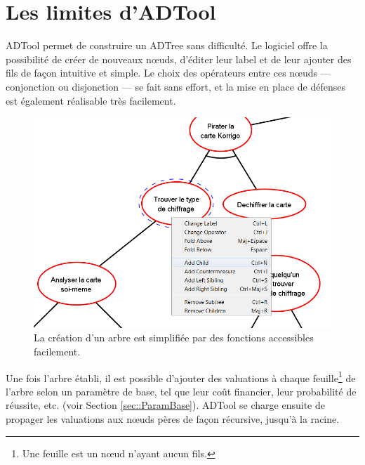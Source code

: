 \section{Les limites d'ADTool}
	\label{sec:adtool}

	ADTool permet de construire un ADTree sans difficulté. Le logiciel offre la possibilité de créer de nouveaux nœuds, d'éditer leur label et de leur ajouter des fils de façon intuitive et simple. Le choix des opérateurs entre ces nœuds --- conjonction ou disjonction ---  se fait sans effort, et la mise en place de défenses est également réalisable très facilement. 
	
	\begin{figure}[h]
            \centering
            \includegraphics[width=1\textwidth]{figure/adtool_add_child.png}
            \caption{La création d'un arbre est simplifiée par des fonctions accessibles facilement.}
            \label{fig:arbre_exemple_1}
    \end{figure}
	
	
	Une fois l'arbre établi, il est possible d'ajouter des valuations à chaque feuille\footnote{Une feuille est un nœud n'ayant aucun fils.} de l'arbre selon un paramètre de base, tel que leur coût financier, leur probabilité de réussite, etc. (voir Section \ref{sec::ParamBase}). ADTool se charge ensuite de propager les valuations aux nœuds pères de façon récursive, jusqu'à la racine.
	

